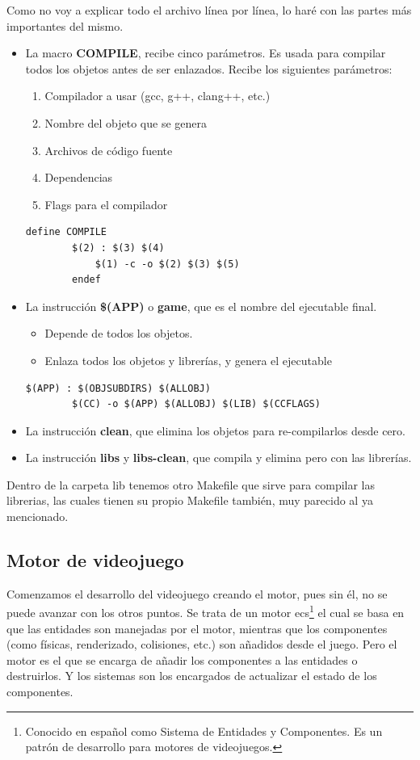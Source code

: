 Como no voy a explicar todo el archivo línea por línea, lo haré con las partes más importantes del mismo. 
\begin{itemize}
	\item La macro \textbf{COMPILE}, recibe cinco parámetros. Es usada para compilar todos los objetos antes de ser enlazados. Recibe los siguientes parámetros:
	\begin{enumerate}
		\item Compilador a usar (gcc, g++, clang++, etc.)
		\item Nombre del objeto que se genera
		\item Archivos de código fuente
		\item Dependencias
		\item Flags para el compilador
	\end{enumerate}
	\begin{lstlisting}[style=C, caption={Macro Compile del Makefile},label=C_code]
		define COMPILE
		$(2) : $(3) $(4)
			$(1) -c -o $(2) $(3) $(5)
		endef
	\end{lstlisting}
	\item La instrucción \textbf{\$(APP)} o \textbf{game}, que es el nombre del ejecutable final. 
	\begin{itemize} 
		\item Depende de todos los objetos. 
		\item Enlaza todos los objetos y librerías, y genera el ejecutable
	\end{itemize}
	\begin{lstlisting}[style=C, caption={Enlazado de los objetos y las librerísa para generar el ejecutable.},label=C_code]
	$(APP) : $(OBJSUBDIRS) $(ALLOBJ)
		$(CC) -o $(APP) $(ALLOBJ) $(LIB) $(CCFLAGS)
	\end{lstlisting}
	\item La instrucción \textbf{clean}, que elimina los objetos para re-compilarlos desde cero.
	\item La instrucción \textbf{libs} y \textbf{libs-clean}, que compila y elimina pero con las librerías.
\end{itemize}
Dentro de la carpeta lib tenemos otro Makefile que sirve para compilar las librerias, las cuales tienen su propio Makefile también, muy parecido al ya mencionado.

\subsection{Motor de videojuego}
Comenzamos el desarrollo del videojuego creando el motor, pues sin él, no se puede avanzar con los otros puntos. Se trata de un motor \gls{ecs}\footnote{Conocido en español como Sistema de Entidades y Componentes. Es un patrón de desarrollo para motores de videojuegos.} el cual se basa en que las entidades son manejadas por el motor, mientras que los componentes (como físicas, renderizado, colisiones, etc.) son añadidos desde el juego. Pero el motor es el que se encarga de añadir los componentes a las entidades o destruirlos. Y los sistemas son los encargados de actualizar el estado de los componentes.

